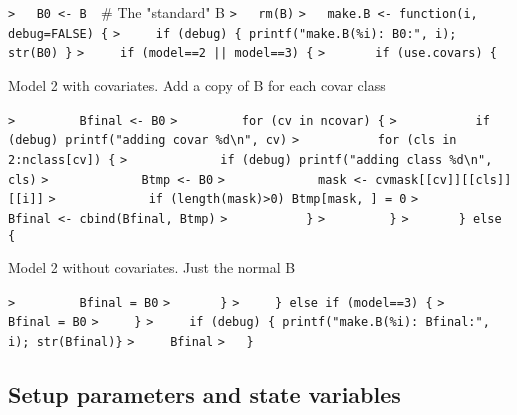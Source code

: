 \documentclass[a4paper]{article}
\begin{document}
\verb~>   B0 <- B  ~{\sffamily\# The "standard" B}\newline
\verb~>   rm(B)~\newline
\verb~>   make.B <- function(i, debug=FALSE) {~\newline
\verb~>     if (debug) { printf("make.B(%i): B0:", i); str(B0) }~\newline
\verb~>     if (model==2 || model==3) {~\newline
\verb~>       if (use.covars) {~\par
Model 2 with covariates. Add a copy of B for each covar class\par
\verb~>         Bfinal <- B0~\newline
\verb~>         for (cv in ncovar) {~\newline
\verb~>           if (debug) printf("adding covar %d\n", cv)~\newline
\verb~>           for (cls in 2:nclass[cv]) {~\newline
\verb~>             if (debug) printf("adding class %d\n", cls)~\newline
\verb~>             Btmp <- B0~\newline
\verb~>             mask <- cvmask[[cv]][[cls]][[i]]~\newline
\verb~>             if (length(mask)>0) Btmp[mask, ] = 0~\newline
\verb~>             Bfinal <- cbind(Bfinal, Btmp)~\newline
\verb~>           }~\newline
\verb~>         }~\newline
\verb~>       } else {~\par
Model 2 without covariates. Just the normal B\par
\verb~>         Bfinal = B0~\newline
\verb~>       }~\newline
\verb~>     } else if (model==3) {~\newline
\verb~>       Bfinal = B0~\newline
\verb~>     }~\newline
\verb~>     if (debug) { printf("make.B(%i): Bfinal:", i); str(Bfinal)}~\newline
\verb~>     Bfinal~\newline
\verb~>   }~\par



\subsection{Setup parameters and state variables}\par
\end{document}
